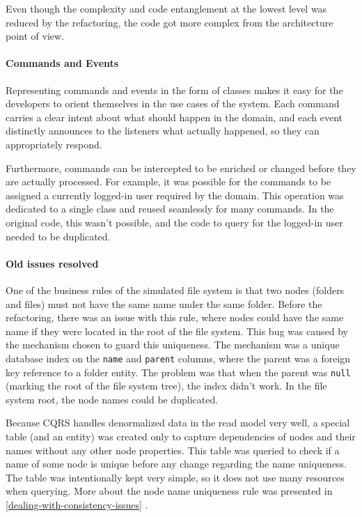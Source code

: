\documentclass{book}
\begin{document}
Even though the complexity and code entanglement at the lowest level was
reduced by the refactoring, the code got more complex from the
architecture point of view.

\paragraph{Commands and Events}\label{commands-and-events}

Representing commands and events in the form of classes makes it easy
for the developers to orient themselves in the use cases of the system.
Each command carries a clear intent about what should happen in the
domain, and each event distinctly announces to the listeners what
actually happened, so they can appropriately respond.

Furthermore, commands can be intercepted to be enriched or changed
before they are actually processed. For example, it was possible for the
commands to be assigned a currently logged-in user required by the
domain. This operation was dedicated to a single class and reused
seamlessly for many commands. In the original code, this wasn't
possible, and the code to query for the logged-in user needed to be
duplicated.

\paragraph{Old issues resolved}\label{old-issues-resolved}

One of the business rules of the simulated file system is that two nodes
(folders and files) must not have the same name under the same folder.
Before the refactoring, there was an issue with this rule, where nodes
could have the same name if they were located in the root of the file
system. This bug was caused by the mechanism chosen to guard this
uniqueness. The mechanism was a unique database index on the
\texttt{name} and \texttt{parent} columns, where the parent was a
foreign key reference to a folder entity. The problem was that when the
parent was \texttt{null} (marking the root of the file system tree), the
index didn't work. In the file system root, the node names could be
duplicated.

Because CQRS handles denormalized data in the read model very well, a
special table (and an entity) was created only to capture dependencies
of nodes and their names without any other node properties. This table
was queried to check if a name of some node is unique before any change
regarding the name uniqueness. The table was intentionally kept very
simple, so it does not use many resources when querying. More about the
node name uniqueness rule was presented in
\ref{dealing-with-consistency-issues}
.
\end{document}
